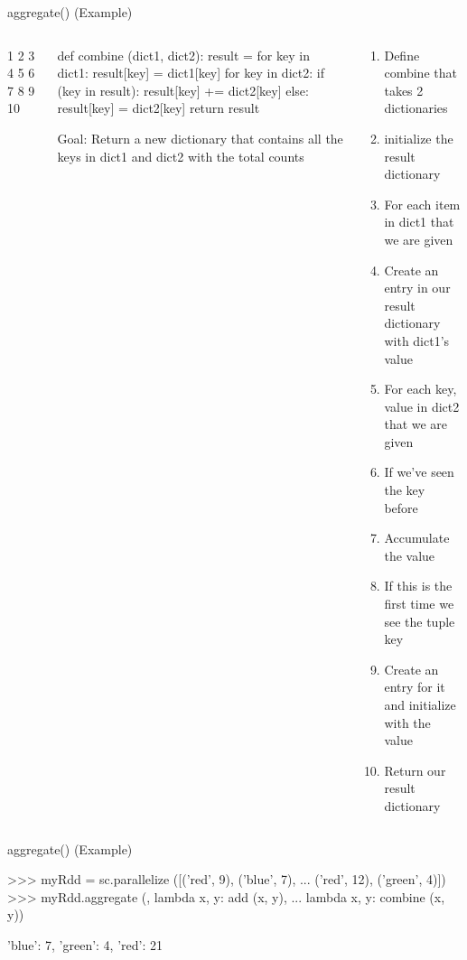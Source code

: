 \documentclass[aspectratio=169]{beamer}
\begin{document}
\begin{frame}[fragile]{aggregate() (Example)}

\begin{columns}[T]
\begin{column}{0.005\textwidth}
\begin{SQL}
1
2
3
4
5
6
7
8
9
10
\end{SQL}
\end{column}
\begin{column}{0.4\textwidth}
\begin{SQL}
def combine (dict1, dict2):
  result = {}
  for key in dict1:
    result[key] = dict1[key]
  for key in dict2:
    if (key in result):
      result[key] += dict2[key]
    else:
      result[key] = dict2[key]
  return result
\end{SQL}
Goal: Return a new dictionary that contains all the keys in  dict1 and dict2 with the total counts 

\end{column}
\begin{column}{0.555\textwidth}
\begin{enumerate}
\item Define combine that takes 2 dictionaries
\item initialize the result dictionary
\item For each item in dict1 that we are given
\item \hspace{1em} Create an entry in our result dictionary with dict1's value
\item For each key, value in dict2 that we are given
\item \hspace{1em} If we've seen the key before
\item  \hspace{2em}Accumulate the value
\item \hspace{1em} If this is the first time we see the tuple key
\item  \hspace{2em} Create an entry for it and initialize with the value
\item Return our result dictionary
\end{enumerate}
\end{column}
\end{columns}
\end{frame}
\begin{frame}[fragile]{aggregate() (Example)}

\begin{SQL}
>>> myRdd = sc.parallelize ([('red', 9), ('blue', 7), 
... ('red', 12), ('green', 4)])
>>> myRdd.aggregate ({}, lambda x, y: add (x, y), 
... lambda x, y: combine (x, y))

{'blue': 7, 'green': 4, 'red': 21}
\end{SQL}
\end{frame}
\end{document}
